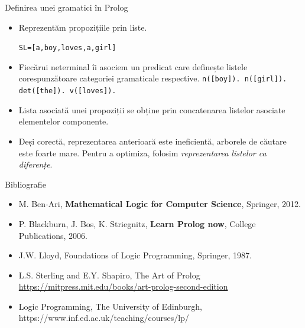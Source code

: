 \documentclass[xcolor=x11names,compress,10pt]{beamer}
\begin{document}
\begin{frame}{Definirea unei gramatici în Prolog}
\begin{itemize}
\item  Reprezentăm propozițiile prin  liste.
\begin{alltt}
SL = [a, boy, loves, a, girl]
\end{alltt}
\medskip\pause

\item Fiecărui neterminal îi asociem un predicat care definește listele corespunzătoare categoriei gramaticale respective. 
\medskip
\texttt{n([boy]). n([girl]). det([the]). v([loves]).}
\medskip\pause

\item Lista asociată unei  propoziții se obține prin concatenarea listelor asociate elementelor componente.
\medskip\pause


\item Deși corectă, reprezentarea anterioară este ineficientă, arborele de căutare este foarte mare. 
 Pentru a optimiza, folosim {\em reprezentarea listelor ca diferențe}.



\end{itemize}

\end{frame}



\begin{frame}{Bibliografie}
\begin{itemize}
		
	\item M. Ben-Ari, \textbf{Mathematical Logic for Computer Science}, Springer, 2012.
	\vspace{.2cm}
	\item P. Blackburn, J. Bos, K. Striegnitz, \textbf{Learn Prolog now}, College Publications, 2006.
	\vspace{.2cm}
	\item J.W. Lloyd, Foundations of Logic Programming, Springer, 1987.
	\vspace{.2cm}
	\item L.S. Sterling and E.Y. Shapiro, The Art of Prolog \url{https://mitpress.mit.edu/books/art-prolog-second-edition}
	\vspace{.2cm}
	\item Logic Programming, The University of Edinburgh, https://www.inf.ed.ac.uk/teaching/courses/lp/
\end{itemize}
\end{frame}

\begin{frame}
\begin{center}
\end{center}
\end{frame}
\end{document}
